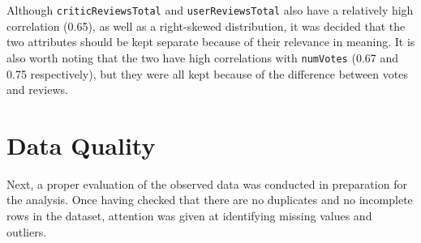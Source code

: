 Although \texttt{criticReviewsTotal} and \texttt{userReviewsTotal} also have a relatively high correlation (0.65), as well as a right-skewed distribution, 
it was decided that the two attributes should be kept separate because of their relevance in meaning. It is also worth noting that the two have high correlations with 
\texttt{numVotes} (0.67 and 0.75 respectively), but they were all kept because of the difference between votes and reviews.



\section{Data Quality}\label{sec:data_quality}
Next, a proper evaluation of the observed data was conducted in preparation for the analysis.
Once having checked that there are no duplicates and no incomplete rows in the dataset,
attention was given at identifying missing values and outliers.



